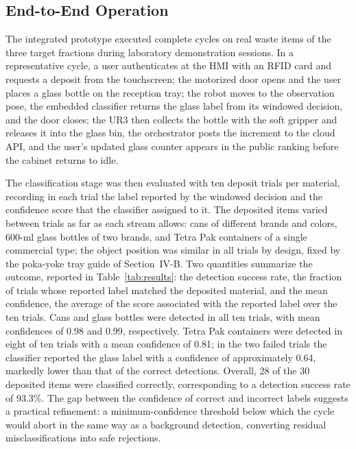 ﻿\documentclass[conference]{IEEEtran}
\begin{document}
\subsection{End-to-End Operation}
The integrated prototype executed complete cycles on real waste items of the three target fractions during laboratory demonstration sessions. In a representative cycle, a user authenticates at the HMI with an RFID card and requests a deposit from the touchscreen; the motorized door opens and the user places a glass bottle on the reception tray; the robot moves to the observation pose, the embedded classifier returns the glass label from its windowed decision, and the door closes; the UR3 then collects the bottle with the soft gripper and releases it into the glass bin, the orchestrator posts the increment to the cloud API, and the user's updated glass counter appears in the public ranking before the cabinet returns to idle.

The classification stage was then evaluated with ten deposit trials per material, recording in each trial the label reported by the windowed decision and the confidence score that the classifier assigned to it. The deposited items varied between trials as far as each stream allows: cans of different brands and colors, 600-ml glass bottles of two brands, and Tetra Pak containers of a single commercial type; the object position was similar in all trials by design, fixed by the poka-yoke tray guide of Section~IV-B. Two quantities summarize the outcome, reported in Table~\ref{tab:results}: the detection success rate, the fraction of trials whose reported label matched the deposited material, and the mean confidence, the average of the score associated with the reported label over the ten trials. Cans and glass bottles were detected in all ten trials, with mean confidences of 0.98 and 0.99, respectively. Tetra Pak containers were detected in eight of ten trials with a mean confidence of 0.81; in the two failed trials the classifier reported the glass label with a confidence of approximately 0.64, markedly lower than that of the correct detections. Overall, 28 of the 30 deposited items were classified correctly, corresponding to a detection success rate of 93.3\%. The gap between the confidence of correct and incorrect labels suggests a practical refinement: a minimum-confidence threshold below which the cycle would abort in the same way as a background detection, converting residual misclassifications into safe rejections.
\end{document}
